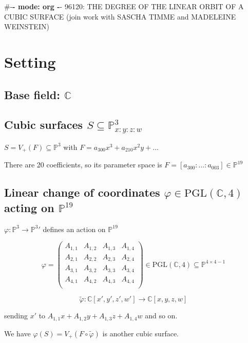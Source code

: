 \documentclass[11pt]{article}
\author{Laura Brustenga i Moncusí}
\date{\today}
\title{}
\begin{document}
\tableofcontents

\#-\textbf{- mode: org -}-
96120: THE DEGREE OF THE LINEAR ORBIT OF A CUBIC SURFACE
(join work with SASCHA TIMME and MADELEINE WEINSTEIN)



\section{Setting}
\label{sec:org18aef96}
\subsection{Base field: \(\mathbb{C}\)}
\label{sec:orgf5b49a2}
\subsection{Cubic surfaces \(S\subseteq\mathbb{P}^3_{x:y:z:w}\)}
\label{sec:orga0e684a}

\(S=V_+(F)\subseteq \mathbb{P}^3\) with \(F=a_{300}x^3+a_{210}x^2y+\dots\)

There are 20 coefficients, so its parameter space is \(F=[a_{300}:\ldots:a_{003}]\in \mathbb{P}^{19}\)

\subsection{Linear change of coordinates \(\varphi\in\mathrm{PGL}(\mathbb{C},4)\) acting on \(\mathbb{P}^{19}\)}
\label{sec:org897f374}

\(\varphi : \mathbb{P}^3\to \mathbb{P}^3'\) defines an action on \(\mathbb{P}^{19}\)

$$
\varphi = \left( \begin{array}{ccccc}
A_{1,1} & A_{1,2} & A_{1,3} & A_{1,4} \\
A_{2,1} & A_{2,2} & A_{2,3} & A_{2,4} \\
A_{3,1} & A_{3,2} & A_{3,3} & A_{3,4} \\
A_{4,1} & A_{4,2} & A_{4,3} & A_{4,4} \\
\end{array}\right)\in\mathrm{PGL}(\mathbb{C},4)\subseteq \mathbb{P}^{4\times 4 -1}
$$

$$\tilde{\varphi}: \mathbb{C}[x',y',z',w']\to \mathbb{C}[x,y,z,w]$$

sending \(x'\) to \(A_{1,1}x+A_{1,2}y+A_{1,3}z+A_{1,4}w\)
and so on.

We have \(\varphi(S) = V_+(F\circ \tilde{\varphi})\) is another cubic surface.
\end{document}
